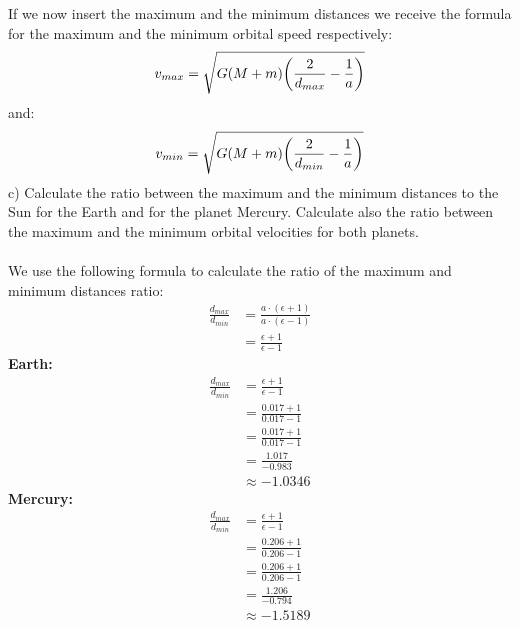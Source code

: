 If we now insert the maximum and the minimum distances we receive the formula for the maximum and the
minimum orbital speed respectively:
\begin{equation*}
    v_{max} = \sqrt{G (M + m) \biggl(\frac{2}{d_{max}} - \frac{1}{a}\biggr)}\\
\end{equation*}
and:
\begin{equation*}
    v_{min} = \sqrt{G (M + m) \biggl(\frac{2}{d_{min}} - \frac{1}{a}\biggr)}\\
\end{equation*}
c) Calculate the ratio between the maximum and the minimum distances to the Sun for the Earth and for 
the planet Mercury. Calculate also the ratio between the maximum and the minimum orbital velocities for
both planets.\\
\\
We use the following formula to calculate the ratio of the maximum and minimum distances ratio:
\begin{equation*}
    \begin{split}
        \frac{d_{max}}{d_{min}} &= \frac{a \cdot (\epsilon + 1)}{a \cdot (\epsilon - 1)}\\
        &= \frac{\epsilon + 1}{\epsilon - 1}
    \end{split}
\end{equation*}
\textbf{Earth:}
\begin{equation*}
    \begin{split}
        \frac{d_{max}}{d_{min}} &= \frac{\epsilon + 1}{\epsilon - 1}\\
        &= \frac{0.017 + 1}{0.017 - 1}\\
        &= \frac{0.017 + 1}{0.017 - 1}\\
        &= \frac{1.017}{-0.983}\\
        &\approx - 1.0346
    \end{split}
\end{equation*}
\textbf{Mercury:}
\begin{equation*}
    \begin{split}
        \frac{d_{max}}{d_{min}} &= \frac{\epsilon + 1}{\epsilon - 1}\\
        &= \frac{0.206 + 1}{0.206 - 1}\\
        &= \frac{0.206 + 1}{0.206 - 1}\\
        &= \frac{1.206}{-0.794}\\
        &\approx - 1.5189
    \end{split}
\end{equation*}
